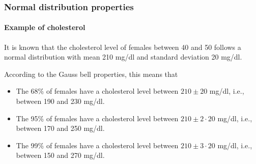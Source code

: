 \begin{frame}
\frametitle{Normal distribution properties}
\framesubtitle{Example of cholesterol}
It is known that the cholesterol level of females between 40 and 50 follows a normal distribution with mean 210 mg/dl
and standard deviation 20 mg/dl. 

According to the Gauss bell properties, this means that
\begin{itemize}
\item The 68\% of females have a cholesterol level between $210\pm 20$ mg/dl, i.e., between 190 and 230 mg/dl.
\item The 95\% of females have a cholesterol level between $210\pm 2\cdot 20$ mg/dl, i.e., between  170 and 250
mg/dl.
\item The 99\% of females have a cholesterol level between $210\pm 3\cdot 20$ mg/dl, i.e., between  150 and 270
mg/dl.
\end{itemize}
\end{frame}


